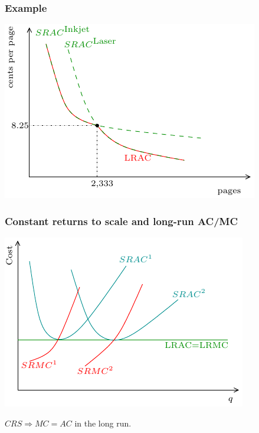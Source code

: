 \documentclass[xcolor=pdftex,dvipsnames]{beamer}
\begin{document}
\begin{frame}
\frametitle{Example}
\begin{center}
\includegraphics{pics/Printer}
 \end{center}

\end{frame}




\begin{frame}
\frametitle{Constant returns to scale and long-run AC/MC}
\begin{center}
\includegraphics{pics/CRSLRAC}
 \end{center}

$CRS\Rightarrow MC=AC$ in the long run. 
\end{frame}
\end{document}
